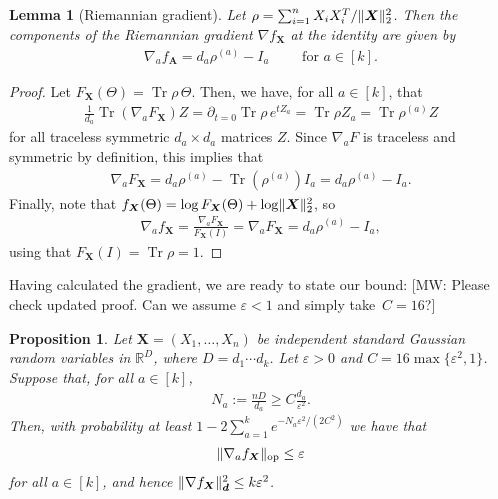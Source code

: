 \documentclass{article}
\newtheorem{prop}[theorem]{Proposition}
\newtheorem{lemma}[theorem]{Lemma}
\DeclarePairedDelimiter{\norm}{\lVert}{\rVert}
\newcommand{\R}{{\mathbb{R}}}
\newcommand{\op}{\operatorname{op}}
\renewcommand{\vec}{\bm}
\newcommand\eps{\varepsilon}
\newcommand\tr{\operatorname{Tr}}
\newcommand{\MW}[1]{{\color{red}[MW: #1]}}
\begin{document}
\begin{lemma}[Riemannian gradient]\label{lem:gradient}
Let $\rho = \sum_{i=1}^n X_i X_i^T / \norm{\vec X}_2^2$.
Then the components of the Riemannian gradient $\nabla f_{\vec X}$ at the identity are given by
\begin{align*}
  \nabla_a f_{\vec A} = d_a \rho^{(a)} - I_a \qquad \text{ for } a \in [k].
\end{align*}
\end{lemma}
\begin{proof}
  Let $F_{\vec X}(\Theta) = \tr \rho \, \Theta$.
  Then, we have, for all $a\in[k]$, that
  \begin{align*}
    \frac1{d_a} \tr (\nabla_a F_{\vec X}) Z
  = \partial_{t=0} \tr \rho \, e^{t Z_a}
  = \tr \rho Z_a
  = \tr \rho^{(a)} Z
  \end{align*}
  for all traceless symmetric $d_a \times d_a$ matrices $Z$.
  Since $\nabla_a F$ is traceless and symmetric by definition, this implies that
  \begin{align*}
    \nabla_a F_{\vec X}
  = d_a \rho^{(a)} - \tr(\rho^{(a)}) I_a
  = d_a \rho^{(a)} - I_a.
  \end{align*}
  Finally, note that $f_{\vec X}(\Theta) = \log F_{\vec X}(\Theta) + \log \norm{\vec X}_2^2$, so
  \begin{align*}
    \nabla_a f_{\vec X}
  = \frac{\nabla_a F_{\vec X}}{F_{\vec X}(I)}
  = \nabla_a F_{\vec X}
  = d_a \rho^{(a)} - I_a,
  \end{align*}
  using that $F_{\vec X}(I) = \tr \rho = 1$.
\end{proof}

Having calculated the gradient, we are ready to state our bound:
\MW{Please check updated proof. Can we assume $\eps<1$ and simply take~$C=16$?}

\begin{prop}\label{prop:gradient-bound}
Let $\vec X = (X_1,\dots,X_n)$ be independent standard Gaussian random variables in $\R^D$, where $D=d_1\cdots{}d_k$.
Let $\eps>0$ and $C = 16\max\{\eps^2,1\}$.
Suppose that, for all $a \in [k]$,
\begin{align*}
  N_a := \frac{n D}{d_a} \geq C \frac{d_a}{\eps^2}.
\end{align*}
Then, with probability at least $1 - 2 \sum_{a=1}^k e^{-N_a \eps^2/(2C^2)}$ we have that
\begin{align*}
  \norm{\nabla_a f_{\vec X}}_{\op} \leq \eps
\end{align*}
for all $a\in[k]$, and hence $\norm{\nabla f_{\vec X}}_{\vec d}^2 \leq k \eps^2$.
\end{prop}
\end{document}
